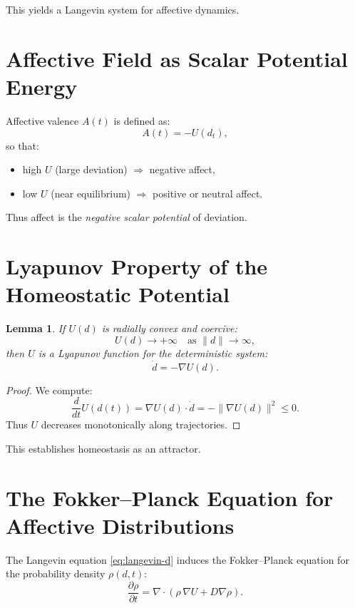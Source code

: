 \documentclass[12pt,oneside]{book}
\theoremstyle{plain}
\newtheorem{lemma}{Lemma}[chapter]
\theoremstyle{definition}
\begin{document}
This yields a Langevin system for affective dynamics.

\section{Affective Field as Scalar Potential Energy}

Affective valence $A(t)$ is defined as:
\begin{equation}
A(t) = - U(d_t),
\end{equation}
so that:
\begin{itemize}
    \item high $U$ (large deviation) $\Rightarrow$ negative affect,
    \item low $U$ (near equilibrium) $\Rightarrow$ positive or neutral affect.
\end{itemize}

Thus affect is the \emph{negative scalar potential} of deviation.

\section{Lyapunov Property of the Homeostatic Potential}

\begin{lemma}
If $U(d)$ is radially convex and coercive:
\[
U(d) \to +\infty \quad \text{as } \|d\|\to\infty,
\]
then $U$ is a Lyapunov function for the deterministic system:
\[
\dot d = -\nabla U(d).
\]
\end{lemma}

\begin{proof}
We compute:
\[
\frac{d}{dt}U(d(t))
=
\nabla U(d)\cdot \dot d
=
-\|\nabla U(d)\|^2
\le 0.
\]
Thus $U$ decreases monotonically along trajectories.
\end{proof}

This establishes homeostasis as an attractor.

\section{The Fokker--Planck Equation for Affective Distributions}

The Langevin equation \eqref{eq:langevin-d} induces the Fokker--Planck equation
for the probability density $\rho(d,t)$:
\begin{equation}
\label{eq:fp}
\frac{\partial \rho}{\partial t}
=
\nabla \cdot
\left(
    \rho\, \nabla U
    + D \nabla \rho
\right).
\end{equation}
\end{document}
